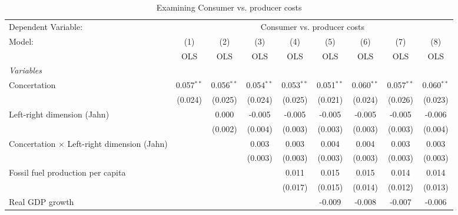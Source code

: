
\begin{table}[htbp]
   \caption{Examining Consumer vs. producer costs}
   \centering
   \begin{tabular}{lcccccccc}
      \toprule
      Dependent Variable: & \multicolumn{8}{c}{Consumer vs. producer costs}\\
      Model:                                             & (1)          & (2)          & (3)          & (4)          & (5)          & (6)          & (7)          & (8)\\  
                                                         &  OLS         & OLS          & OLS          & OLS          & OLS          & OLS          & OLS          & OLS\\  
      \midrule
      \emph{Variables}\\
      Concertation                                       & 0.057$^{**}$ & 0.056$^{**}$ & 0.054$^{**}$ & 0.053$^{**}$ & 0.051$^{**}$ & 0.060$^{**}$ & 0.057$^{**}$ & 0.060$^{**}$\\   
                                                         & (0.024)      & (0.025)      & (0.024)      & (0.025)      & (0.021)      & (0.024)      & (0.026)      & (0.023)\\   
      Left-right dimension (Jahn)                        &              & 0.000        & -0.005       & -0.005       & -0.005       & -0.005       & -0.005       & -0.006\\   
                                                         &              & (0.002)      & (0.004)      & (0.003)      & (0.003)      & (0.003)      & (0.003)      & (0.004)\\   
      Concertation $\times$ Left-right dimension (Jahn)  &              &              & 0.003        & 0.003        & 0.004        & 0.004        & 0.003        & 0.003\\   
                                                         &              &              & (0.003)      & (0.003)      & (0.003)      & (0.003)      & (0.003)      & (0.003)\\   
      Fossil fuel production per capita                  &              &              &              & 0.011        & 0.015        & 0.015        & 0.014        & 0.014\\   
                                                         &              &              &              & (0.017)      & (0.015)      & (0.014)      & (0.012)      & (0.013)\\   
      Real GDP growth                                    &              &              &              &              & -0.009       & -0.008       & -0.007       & -0.006\\   

\end{tabular}
\end{table}

